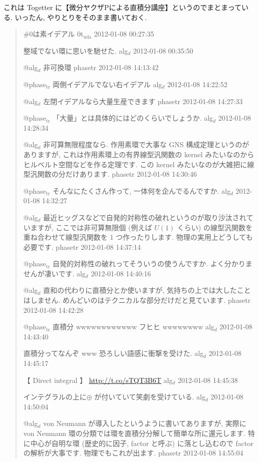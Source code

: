 \documentclass[openany, a4paper, oneside]{book}
\theoremstyle{break}
\theoremstyle{breakdefn}
\begin{document}
これは Togetter に【微分ヤクザPによる直積分講座】というのでまとまっている.
いったん, やりとりをそのまま書いておく.
\begin{quote}
\#0は素イデアル
0t$_{\mathrm{uda}}$ 2012-01-08 00:27:35

整域でない環に思いを馳せた.
alg$_d$ 2012-01-08 00:35:50

@alg$_d$ 非可換環
phasetr 2012-01-08 14:13:42

@phase$_{\mathrm{tr}}$ 両側イデアルでない右イデアル
alg$_d$ 2012-01-08 14:22:52

@alg$_d$ 左閉イデアルなら大量生産できます
phasetr 2012-01-08 14:27:33

@phase$_{\mathrm{tr}}$ 「大量」とは具体的にはどのくらいでしょうか.
alg$_d$ 2012-01-08 14:28:34

@alg$_d$ 非可算無限程度なら. 作用素環で大事な GNS 構成定理というのがありますが,
これは作用素環上の有界線型汎関数の kernel みたいなのからヒルベルト空間などを作る定理です.
この kernel みたいなのが大雑把に線型汎関数の分だけあります.
phasetr 2012-01-08 14:30:46

@phase$_{\mathrm{tr}}$ そんなにたくさん作って, 一体何を企んでるんですか.
alg$_d$ 2012-01-08 14:32:27

@alg$_d$ 最近ヒッグスなどで自発的対称性の破れというのが取り沙汰されていますが,
ここでは非可算無限個 (例えば $U (1)$ くらい) の線型汎関数を重ね合わせて線型汎関数を 1 つ作ったりします.
物理の実用上どうしても必要です.
phasetr 2012-01-08 14:37:14

@phase$_{\mathrm{tr}}$ 自発的対称性の破れってそういうの使うんですか. よく分かりませんが凄いです.
alg$_d$ 2012-01-08 14:40:16

@alg$_d$ 直和の代わりに直積分とか使いますが, 気持ちの上では大したことはしません.
めんどいのはテクニカルな部分だけだと見ています.
phasetr 2012-01-08 14:42:28

@phase$_{\mathrm{tr}}$ 直積分 wwwwwwwwwwww フヒヒ wwwwwwww
alg$_d$ 2012-01-08 14:43:40

直積分ってなんぞ www 恐ろしい語感に衝撃を受けた.
alg$_d$ 2012-01-08 14:45:17

【 Direct integral 】
\href{http://t.co/sTQT3B6T}{http://t.co/sTQT3B6T}
alg$_d$ 2012-01-08 14:45:38

インテグラルの上に$\oplus$ が付いていて笑劇を受けている.
alg$_d$ 2012-01-08 14:50:04

@alg$_d$ von Neumann が導入したというように書いてありますが,
実際に von Neumann 環の分類では環を直積分分解して簡単な所に還元します.
特に中心が自明な環 (歴史的に因子, factor と呼ぶ) に落とし込むので factor の解析が大事です.
物理でもこれが出ます.
phasetr 2012-01-08 14:55:04


\end{quote}
\end{document}
